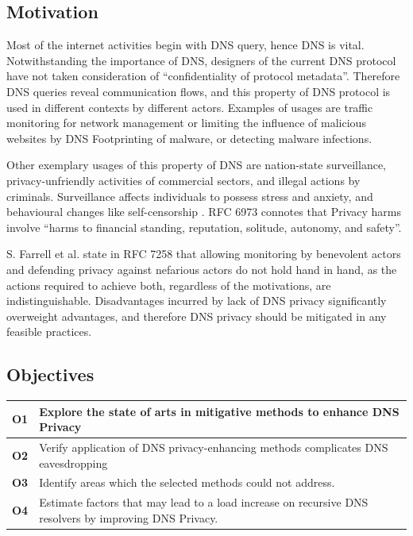 \documentclass[a4paper,12pt]{article}
\begin{document}
\subsection{Motivation}
Most of the internet activities begin with DNS query, hence DNS is vital. Notwithstanding the importance of DNS, designers of the current DNS protocol have not taken consideration of ``confidentiality of protocol metadata''. Therefore DNS queries reveal communication flows, and this property of DNS protocol is used in different contexts by different actors. Examples of usages are traffic monitoring for network management or limiting the influence of malicious websites by DNS Footprinting of malware\cite{stoner2010dns}, or detecting malware infections\cite{lemos2013got}.

Other exemplary usages of this property of DNS are nation-state surveillance, privacy-unfriendly activities of commercial sectors\cite{weaver2011redirecting}, and illegal actions by criminals. Surveillance affects individuals to possess stress and anxiety\cite{oulasvirta2012long}, and behavioural changes like self-censorship \cite{rfc6973}. RFC 6973 connotes that Privacy harms involve ``harms to financial standing, reputation, solitude, autonomy, and safety\cite{rfc6973}''.

S. Farrell et al. state in RFC 7258 that allowing monitoring by benevolent actors and defending privacy against nefarious actors do not hold hand in hand, as the actions required to achieve both, regardless of the motivations, are indistinguishable\cite{rfc7258}.
Disadvantages incurred by lack of DNS privacy significantly overweight advantages, and therefore DNS privacy should be mitigated in any feasible practices.

\subsection{Objectives}

\begin{tabular} {|p{1.2cm}|p{11.6cm}|} \hline
    \textbf{O1} & Explore the state of arts in mitigative methods to enhance DNS Privacy \\ \hline
    \textbf{O2} & Verify application of DNS privacy-enhancing methods complicates DNS eavesdropping\\ \hline
    \textbf{O3} & Identify areas which the selected methods could not address. \\ \hline
    \textbf{O4} & Estimate factors that may lead to a load increase on recursive DNS resolvers by improving DNS Privacy.\\ \hline
\end{tabular}\\
\end{document}
